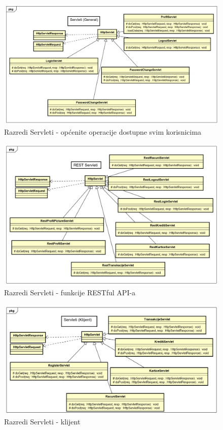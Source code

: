 			\begin{figure}[H]
				\includegraphics[scale=0.5]{Slike/Class Diagram6.PNG}
				\centering
				\caption{Razredi Servleti - općenite operacije dostupne svim korisnicima}
				\label{fig:dijagram}
			\end{figure}
		
			\begin{figure}[H]
				\includegraphics[scale=0.5]{Slike/Class Diagram7.PNG}
				\centering
				\caption{Razredi Servleti - funkcije RESTful API-a}
				\label{fig:dijagram}
			\end{figure}
		
			\begin{figure}[H]
				\includegraphics[scale=0.5]{Slike/Class Diagram8.PNG}
				\centering
				\caption{Razredi Servleti - klijent}
				\label{fig:dijagram}
			\end{figure}
		
